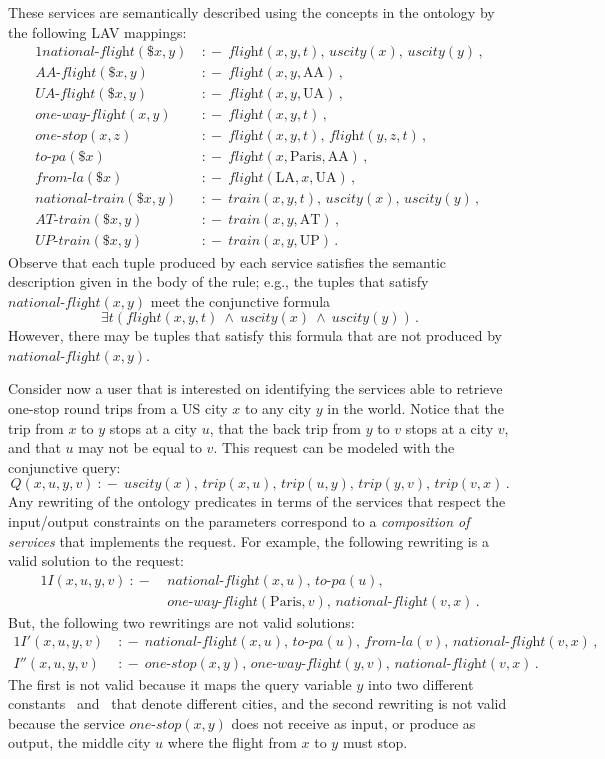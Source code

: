 \documentclass{llncs}
\newcommand{\qrule}{:\!\!-}
\newcommand{\trip}{\textit{trip}}
\newcommand{\AAflight}{\textit{AA-flight}}
\newcommand{\UAflight}{\textit{UA-flight}}
\newcommand{\ATtrain}{\textit{AT-train}}
\newcommand{\UPtrain}{\textit{UP-train}}
\newcommand{\flight}{\textit{flight}}
\newcommand{\train}{\textit{train}}
\newcommand{\UScity}{\textit{uscity}}
\renewcommand{\AA}{\text{AA}}
\newcommand{\UA}{\text{UA}}
\newcommand{\AT}{\text{AT}}
\newcommand{\UP}{\text{UP}}
\newcommand{\PA}{\text{Paris}}
\newcommand{\LA}{\text{LA}}
\newcommand{\nationaltlight}{\textit{national-flight}}
\newcommand{\onewayflight}{\textit{one-way-flight}}
\newcommand{\nationaltrain}{\textit{national-train}}
\newcommand{\onestop}{\textit{one-stop}}
\newcommand{\toPA}{\textit{to-pa}}
\newcommand{\fromLA}{\textit{from-la}}
\begin{document}
These services are semantically described using the concepts in the ontology by
the following LAV mappings:
\begin{alignat*}{1}
\nationaltlight(\$x,y)\ &\qrule\ \flight(x,y,t),\,\UScity(x),\,\UScity(y)\,, \\
\AAflight(\$x,y)\       &\qrule\ \flight(x,y,\AA)\,, \\
\UAflight(\$x,y)\       &\qrule\ \flight(x,y,\UA)\,, \\
\onewayflight(x,y)\     &\qrule\ \flight(x,y,t)\,, \\
\onestop(x,z)\          &\qrule\ \flight(x,y,t),\,\flight(y,z,t)\,, \\
\toPA(\$x)\             &\qrule\ \flight(x,\PA,\AA)\,, \\
\fromLA(\$x)\           &\qrule\ \flight(\LA,x,\UA)\,, \\
\nationaltrain(\$x,y)\  &\qrule\ \train(x,y,t),\,\UScity(x),\,\UScity(y)\,, \\
\ATtrain(\$x,y)\        &\qrule\ \train(x,y,\AT)\,, \\
\UPtrain(\$x,y)\        &\qrule\ \train(x,y,\UP)\,.
\end{alignat*}
Observe that each tuple produced by each service satisfies the semantic
description given in the body of the rule; e.g., the tuples that satisfy
$\nationaltlight(x,y)$ meet the conjunctive formula
\[ \exists t(\flight(x,y,t)\ \land\ \UScity(x)\ \land\ \UScity(y))\,. \]
However, there may be tuples that satisfy this formula that are not
produced by $\nationaltlight(x,y)$.

Consider now a user that is interested on identifying the services able to
retrieve one-stop round trips from a US city $x$ to any city $y$ in the world.
Notice that the trip from $x$ to $y$ stops at a city $u$, that the back trip
from $y$ to $v$ stops at a city $v$, and that $u$ may not be equal to $v$.
This request can be modeled with the conjunctive query:
\[ Q(x,u,y,v)\ \qrule\ \UScity(x),\,\trip(x,u),\,\trip(u,y),\,\trip(y,v),\,\trip(v,x)\,. \]
Any rewriting of the ontology predicates in terms of the services that
respect the input/output constraints on the parameters correspond to a
\emph{composition of services} that implements the request.
For example, the following rewriting is a valid solution to the request:
\begin{alignat*}{1}
I(x,u,y,v)\ \qrule\ &\nationaltlight(x,u),\,\toPA(u),\, \\
                    &\onewayflight(\PA,v),\,\nationaltlight(v,x)\,. 
\end{alignat*}
But, the following two rewritings are not valid solutions:
\begin{alignat*}{1}
 I'(x,u,y,v)\  &\qrule\ \nationaltlight(x,u),\,\toPA(u),\,\fromLA(v),\,\nationaltlight(v,x)\,, \\
I''(x,u,y,v)\  &\qrule\ \onestop(x,y),\,\onewayflight(y,v),\,\nationaltlight(v,x)\,.
\end{alignat*}
The first is not valid because it maps the query variable $y$ into two different
constants \PA\ and \LA\ that denote different cities, and the second rewriting is
not valid because the service $\onestop(x,y)$ does not receive as input, or produce
as output, the middle city $u$ where the flight from $x$ to $y$ must stop.
\end{document}
